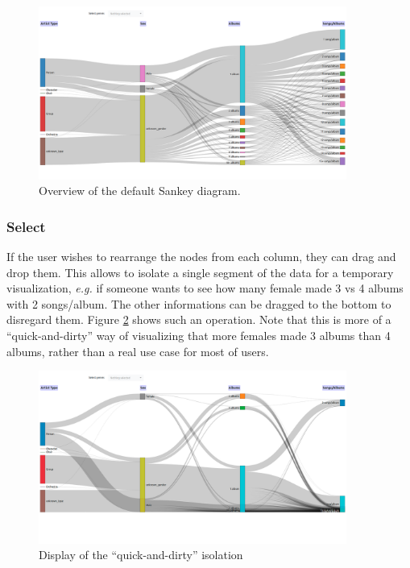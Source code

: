 \documentclass[a4paper, 11pt, oneside]{article}
\newcommand{\eg}{\textit{e.g. }}
\begin{document}
\begin{figure}[ht]
    \centering
    \includegraphics[width=0.9\textwidth]{Images/joris-sankey-overview.png}
    \caption{Overview of the default Sankey diagram.}
    \label{fig:joris_sankey_overview}
\end{figure}

\subsubsection{Select}

If the user wishes to rearrange the nodes from each column, they can drag and drop them. This allows to isolate a single segment of the data for a temporary visualization, \eg if someone wants to see how many female made 3 vs 4 albums with 2 songs/album. The other informations can be dragged to the bottom to disregard them. Figure \ref{fig:joris_sankey_isolate} shows such an operation. Note that this is more of a ``quick-and-dirty'' way of visualizing that more females made 3 albums than 4 albums, rather than a real use case for most of users.

\begin{figure}[ht]
    \centering
    \includegraphics[width=0.9\textwidth]{Images/joris-sankey-isolate.png}
    \caption{Display of the ``quick-and-dirty'' isolation}
    \label{fig:joris_sankey_isolate}
\end{figure}
\end{document}
